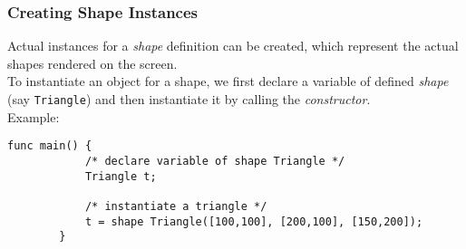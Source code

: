     \subsubsection{Creating Shape Instances}
    Actual instances for a \textit{shape} definition can be created, which represent the actual shapes rendered on the screen.\\
    To instantiate an object for a shape, we first declare a variable of defined \textit{shape} (say \texttt{Triangle}) and then instantiate it by calling the \textit{constructor}.\\
    Example:\\
    \begin{lstlisting}[style=sol]
        func main() {
            /* declare variable of shape Triangle */
            Triangle t; 

            /* instantiate a triangle */
            t = shape Triangle([100,100], [200,100], [150,200]); 
        }
    \end{lstlisting}
